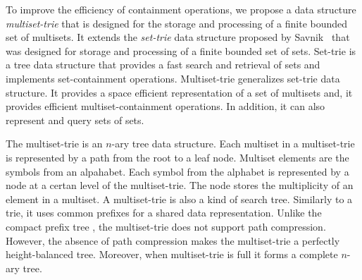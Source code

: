 %
%
To improve the efficiency of containment operations, we propose a data structure \emph{multiset-trie} that is designed for the storage and processing of a finite bounded set of multisets. It extends the \emph{set-trie} data structure proposed by Savnik~\cite{savnik2013index} that was designed for storage and processing of a finite bounded set of sets. 
%
Set-trie is a tree data structure that provides a fast search and retrieval of sets and implements set-containment operations. Multiset-trie generalizes set-trie data structure. It provides a space efficient representation of a set of multisets and, it provides efficient multiset-containment operations. In addition, it can also represent and query sets of sets.

The multiset-trie is an $n$-ary tree data structure. Each multiset in a multiset-trie is represented by a path from the root to a leaf node. Multiset elements are the symbols from an alpahabet. Each symbol from the alphabet is represented by a node at a certan level of the multiset-trie. The node stores the multiplicity of an element in a multiset.
%
%
A multiset-trie is also a kind of search tree. Similarly to a trie, it uses common prefixes for a shared data representation. Unlike the compact prefix tree \cite{Sedgewick:2011:ALG:2011916}, the multiset-trie does not support path compression. However, the absence of path compression makes the multiset-trie a perfectly height-balanced tree. Moreover, when multiset-trie is full it forms a complete $n$-ary tree.
%

